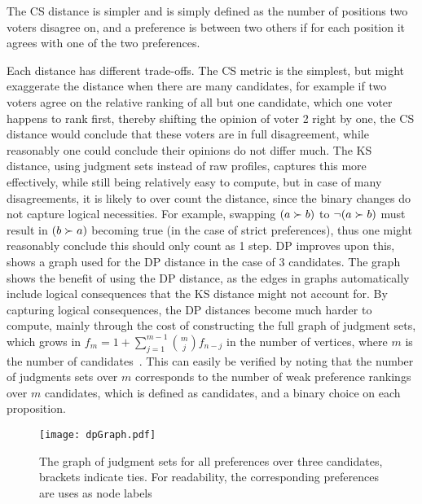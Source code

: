 The CS distance is simpler and is simply defined as the number of positions two
voters disagree on, and a preference is between two others if for each position
it agrees with one of the two preferences.

Each distance has different trade-offs. The CS metric is the simplest, but might
exaggerate the distance when there are many candidates, for example if two voters
agree on the relative ranking of all but one candidate, which one voter happens
to rank first, thereby shifting the opinion of voter 2 right by one, the CS
distance would conclude that these voters are in full disagreement, while
reasonably one could conclude their opinions do not differ much. The KS
distance, using judgment sets instead of raw profiles, captures this more
effectively, while still being relatively easy to compute, but in case of many
disagreements, it is likely to over count the distance, since the binary
changes do not capture logical necessities. For example, swapping $( a \succ
	b)$ to $\neg (a \succ b)$ must result in $(b \succ a)$ becoming true (in the
case of strict preferences), thus one might reasonably conclude this should
only count as 1 step. DP improves upon this,  shows a
graph used for the DP distance in the case of 3 candidates. The graph shows the
benefit of using the DP distance, as the edges in graphs automatically include
logical consequences that the KS distance might not account for. By
capturing logical consequences, the DP distances become much harder to
compute, mainly through the cost of constructing the full graph of judgment
sets, which grows in $f_m = 1 + \sum_{j=1}^{m-1} \binom{m}{j} f_{n-j}$ in the
number of vertices, where $m$ is the number of
candidates~\cite{grossPreferentialArrangements1962}. This can easily be
verified by noting that the number of judgments sets over $m$ corresponds to
the number of weak preference rankings over $m$ candidates, which is defined as
candidates, and a binary choice on each proposition.



\vspace{1em}
\begin{figure}[ht]
	\centering
	\texttt{[image: dpGraph.pdf]}
	\caption{The graph of judgment sets for all preferences over three
		candidates, brackets indicate ties. For readability, the corresponding
		preferences are uses as node labels}
	\label{figure:DPDistance}
\end{figure}



